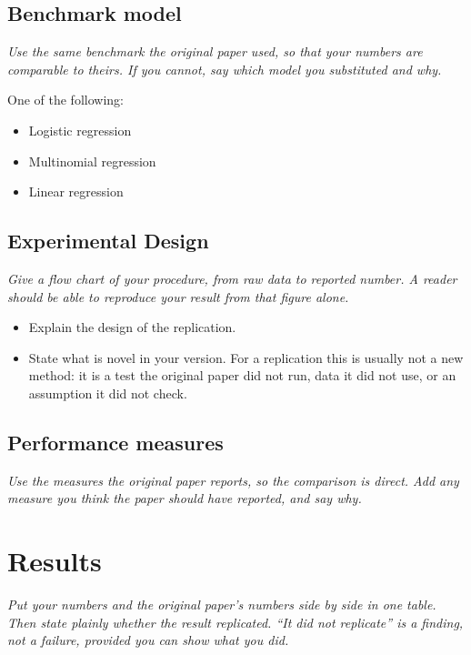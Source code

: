 \documentclass[12pt]{article}
\newcommand{\inst}[1]{\textit{#1}}
\begin{document}
\subsection{Benchmark model}

\inst{Use the same benchmark the original paper used, so that your numbers are
comparable to theirs. If you cannot, say which model you substituted and why.}

One of the following:
\begin{itemize}
\item Logistic regression
\item Multinomial regression
\item Linear regression
\end{itemize}


\subsection{Experimental Design}

\inst{Give a flow chart of your procedure, from raw data to reported number.
A reader should be able to reproduce your result from that figure alone.}

\begin{itemize}
\item Explain the design of the replication.
\item State what is novel in your version. For a replication this is usually not a
      new method: it is a test the original paper did not run, data it did not use,
      or an assumption it did not check.
\end{itemize}


\subsection{Performance measures}

\inst{Use the measures the original paper reports, so the comparison is direct.
Add any measure you think the paper should have reported, and say why.}


\section{Results}

\inst{Put your numbers and the original paper's numbers side by side in one table.
Then state plainly whether the result replicated. ``It did not replicate'' is a
finding, not a failure, provided you can show what you did.}
\end{document}
